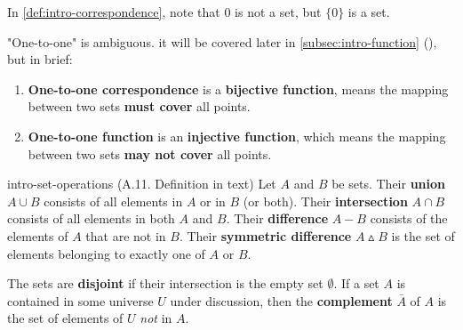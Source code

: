 \documentclass[../src/handouts/main.tex]{subfiles}
\begin{document}
In \cref{def:intro-correspondence}, note that 0 is not a set, but $\{ 0 \}$ is a set.

"One-to-one" is ambiguous. it will be covered later in \cref{subsec:intro-function} (), but in brief:
\begin{enumerate}
  \item \textbf{One-to-one correspondence} is a \textbf{bijective function}, means the mapping between two sets \textbf{must cover} all points.
  \item \textbf{One-to-one function} is an \textbf{injective function}, which means the mapping between two sets \textbf{may not cover} all points.
\end{enumerate}

\begin{definition}{}{intro-set-operations}
  (A.11. Definition in text)
  Let $A$ and $B$ be sets.
  Their \textbf{union} $A \cup B$ consists of all elements in $A$ or in $B$ (or both).
  Their \textbf{intersection} $A \cap B$ consists of all elements in both $A$ and $B$.
  Their \textbf{difference} $A - B$ consists of the elements of $A$ that are not in $B$.
  Their \textbf{symmetric difference} $A \smalltriangleup B$ is the set of elements belonging to exactly one of $A$ or $B$.

  The sets are \textbf{disjoint} if their intersection is the empty set $\emptyset$.
  If a set $A$ is contained in some universe $U$ under discussion, then the \textbf{complement} $\bar A$ of $A$ is the set of elements of $U$ \textit{not} in $A$.

  \centering
\end{definition}
\end{document}
